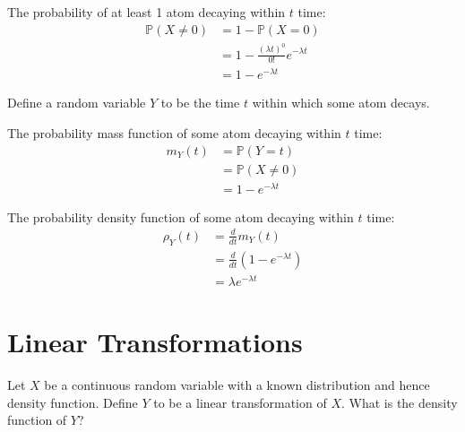\documentclass{article}
\begin{document}
	The probability of at least 1 atom decaying within $t$ time:
	\begin{align*}
		\mathbb{P}(X\neq 0) &= 1 - \mathbb{P}(X=0) \\
		&= 1 - \frac{(\lambda t)^0}{0!}e^{-\lambda t} \\
		&= 1 - e^{-\lambda t}
	\end{align*}

	Define a random variable $Y$ to be the time $t$ within which some atom decays.

	The probability mass function of some atom decaying within $t$ time:
	\begin{align*}
		m_Y(t) &= \mathbb{P}(Y=t) \\
		&= \mathbb{P}(X\neq 0) \\
		&= 1 - e^{-\lambda t}
	\end{align*}

	The probability density function of some atom decaying within $t$ time:
	\begin{align*}
		\rho_Y(t) &= \frac{d}{dt}m_Y(t) \\
		&= \frac{d}{dt}(1 - e^{-\lambda t}) \\
		&= \lambda e^{-\lambda t}
	\end{align*}

	\section{Linear Transformations}

	Let $X$ be a continuous random variable with a known distribution and hence density function. Define $Y$ to be a linear transformation of $X$. What is the density function of $Y$?
\end{document}
